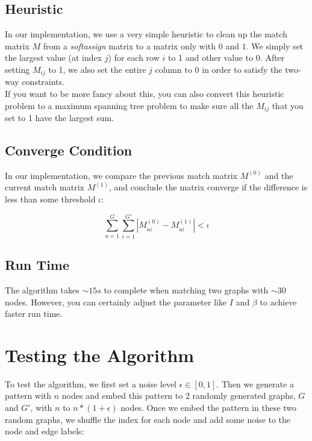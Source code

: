 \subsection{Heuristic}

In our implementation, we use a very simple heuristic to clean up the match matrix $M$ from a \emph{softassign} matrix to a matrix only with $0$ and $1$. We simply set the largest value (at index $j$) for each row $i$ to 1 and other value to 0. After setting $M_{ij}$ to 1, we also set the entire $j$ column to 0 in order to satisfy the two-way constraints.\\

If you want to be more fancy about this, you can also convert this heuristic problem to a maximum spanning tree problem to make sure all the $M_{ij}$ that you set to 1 have the largest sum.

\subsection{Converge Condition}

In our implementation, we compare the previous match matrix $M^{(0)}$ and the current match matrix $M^{(1)}$, and conclude the matrix converge if the difference is less than some threshold $\iota$:

\begin{equation} 
\sum_{a=1}^{G}\sum_{i=1}^{G'}|M_{ai}^{(0)}-M_{ai}^{(1)}|<\iota
\end{equation}

\subsection{Run Time}
\label{ssec:graphmatchingruntime}

The algorithm takes $\sim15s$ to complete when matching two graphs with $\sim30$ nodes. However, you can certainly adjust the parameter like $I$ and $\beta$ to achieve faster run time.

\section{Testing the Algorithm}
\label{sec:graphmatchingtest}

To test the algorithm, we first set a noise level $\epsilon \in [0,1]$. Then we generate a pattern with $n$ nodes and embed this pattern to $2$ randomly generated graphs, $G$ and $G'$, with $n$ to $n*(1+\epsilon)$ nodes. Once we embed the pattern in these two random graphs, we shuffle the index for each node and add some noise to the node and edge labels:

